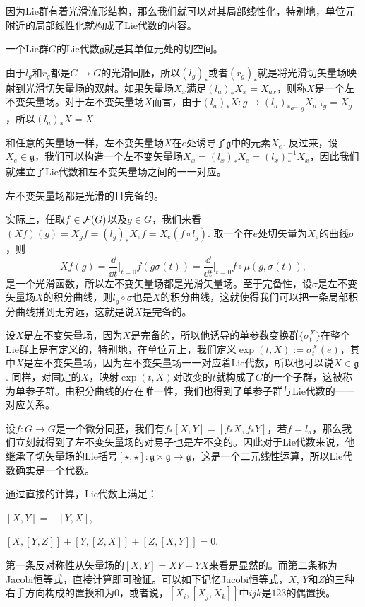 \documentclass[9pt]{extarticle}
\newcommand{\lag}{{\mathfrak{g}}}
\begin{document}
因为Lie群有着光滑流形结构，那么我们就可以对其局部线性化，特别地，单位元附近的局部线性化就构成了Lie代数的内容。

\para 一个Lie群$G$的Lie代数$\lag$就是其单位元处的切空间。

由于$l_g$和$r_g$都是$G\to G$的光滑同胚，所以$(l_g)_*$或者$(r_g)_*$就是将光滑切矢量场映射到光滑切矢量场的双射。如果矢量场$X_x$满足$(l_a)_*X_x=X_{ax}$，则称$X$是一个左不变矢量场。对于左不变矢量场$X$而言，由于$(l_a)_*X:g\mapsto (l_a)_{*a^{-1}g}X_{a^{-1}g}=X_g$，所以$(l_a)_*X=X$.

和任意的矢量场一样，左不变矢量场$X$在$e$处诱导了$\lag$中的元素$X_e$. 反过来，设$X_e\in\lag$，我们可以构造一个左不变矢量场$X_x=(l_{x})_*X_e=(l_x)^{-1}_*X_x$，因此我们就建立了Lie代数和左不变矢量场之间的一一对应。

\para 左不变矢量场都是光滑的且完备的。

实际上，任取$f\in\mathcal{F}(G)$以及$g\in G$，我们来看$(Xf)(g)=X_gf=(l_g)_{*}X_ef=X_e(f\circ l_g)$. 取一个在$e$处切矢量为$X_e$的曲线$\sigma$，则
\[
	Xf(g)=\frac{\dd }{\dd t}\bigg|_{t=0}f(g\sigma(t))=\frac{\dd }{\dd t}\bigg|_{t=0}f\circ \mu(g,\sigma(t)),
\]
是一个光滑函数，所以左不变矢量场都是光滑矢量场。至于完备性，设$\sigma$是左不变矢量场$X$的积分曲线，则$l_g\circ \sigma$也是$X$的积分曲线，这就使得我们可以把一条局部积分曲线拼到无穷远，这就是说$X$是完备的。

\para 设$X$是左不变矢量场，因为$X$是完备的，所以他诱导的单参数变换群$\{\sigma^X_t\}$在整个Lie群上是有定义的，特别地，在单位元上，我们定义$\exp(t,X):=\sigma^X_t(e)$，其中$X$是左不变矢量场，因为左不变矢量场一一对应着Lie代数，所以也可以说$X\in \lag$. 同样，对固定的$X$，映射$\exp(t,X)$对改变的$t$就构成了$G$的一个子群，这被称为单参子群。由积分曲线的存在唯一性，我们也得到了单参子群与Lie代数的一一对应关系。

\pro 设$f:G\to G$是一个微分同胚，我们有$f_*[X,Y]=[f_*X,f_*Y]$，若$f=l_a$，那么我们立刻就得到了左不变矢量场的对易子也是左不变的。因此对于Lie代数来说，他继承了切矢量场的Lie括号$[\star,\star]:\lag\times \lag\to \lag$，这是一个二元线性运算，所以Lie代数确实是一个代数。

通过直接的计算，Lie代数上满足：

 $[X,Y]=-[Y,X]$,

 $[X,[Y,Z]]+[Y,[Z,X]]+[Z,[X,Y]]=0$.

第一条反对称性从矢量场的$[X,Y]=XY-YX$来看是显然的。而第二条称为Jacobi恒等式，直接计算即可验证。可以如下记忆Jacobi恒等式，$X$, $Y$和$Z$的三种右手方向构成的置换和为$0$，或者说，$[X_i,[X_j,X_k]]$中$ijk$是$123$的偶置换。
\end{document}
